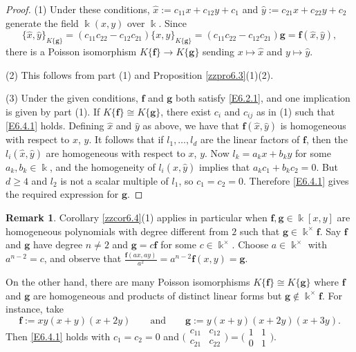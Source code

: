 \documentclass[12pt]{amsart}
\theoremstyle{plain}
\numberwithin{theorem}{section}
\numberwithin{equation}{theorem}
\theoremstyle{definition}
\newtheorem{remark}[theorem]{Remark}
\newcommand \bff {{\mathbf{f}}}
\newcommand \bfg {{\mathbf{g}}}
\newcommand \xhat {\hat{x}}
\newcommand \yhat {\hat{y}}
\newcommand \kx {\Bbbk^\times}
\begin{document}
\begin{proof}
(1) Under these conditions, $\xhat := c_{11}x+c_{12}y+c_1$ and $\yhat := c_{21}x+c_{22}y+c_2$ generate the field $\Bbbk(x,y)$ over $\Bbbk$.  Since
$$
\{ \xhat,\yhat \}_{K\{\bfg\}} = (c_{11}c_{22} - c_{12}c_{21}) \{x,y\}_{K\{\bfg\}} =  (c_{11}c_{22} - c_{12}c_{21}) \bfg = \bff(\xhat,\yhat),
$$
there is a Poisson isomorphism $K\{\bff\} \rightarrow K\{\bfg\}$ sending $x \mapsto \xhat$ and $y \mapsto \yhat$.

(2) This follows from part (1) and Proposition \ref{zzpro6.3}(1)(2).

(3) Under the given conditions, $\bff$ and $\bfg$ both satisfy \eqref{E6.2.1}, and one implication is given by part (1).  If $K\{\bff\} \cong K\{\bfg\}$, there exist $c_i$ and $c_{ij}$ as in (1) such that \eqref{E6.4.1} holds.  Defining $\xhat$ and $\yhat$ as above, we have that $\bff(\xhat,\yhat)$ is homogeneous with respect to $x$, $y$.  It follows that if $l_1,\dots,l_d$ are the linear factors of $\bff$, then the $l_i(\xhat,\yhat)$ are homogeneous with respect to $x$, $y$.  Now $l_k = a_kx+b_ky$ for some $a_k,b_k \in \Bbbk$, and the homogeneity of $l_i(\xhat,\yhat)$ implies that $a_kc_1+b_kc_2=0$.  But $d\ge4$ and $l_2$ is not a scalar multiple of $l_1$, so $c_1=c_2=0$.  Therefore \eqref{E6.4.1} gives the required expression for $\bfg$.
\end{proof}

\begin{remark}  \label{zzrem6.5} 
Corollary \ref{zzcor6.4}(1) applies in particular when $\bff,\bfg \in \Bbbk[x,y]$ are homogeneous polynomials with degree different from $2$ such that $\bfg \in \kx \bff$.  Say $\bff$ and $\bfg$ have degree $n \ne 2$ and $\bfg = c \bff$ for some $c \in \kx$.  Choose $a \in \kx$ with $a^{n-2} = c$, and observe that $\frac{\bff(ax,ay)}{a^2} = a^{n-2} \bff(x,y) = \bfg$.

On the other hand, there are many Poisson isomorphisms $K\{\bff\} \cong K\{\bfg\}$ where $\bff$ and $\bfg$ are homogeneous and products of distinct linear forms but $\bfg \notin \kx \bff$.  For instance, take
$$
\bff := x y (x+y) (x+2y) \qquad \text{and} \qquad \bfg := y (x+y) (x+2y) (x+3y).
$$
Then \eqref{E6.4.1} holds with $c_1=c_2=0$ and $\bigl( \begin{smallmatrix} c_{11}&c_{12}\\ c_{21}&c_{22} \end{smallmatrix} \bigr) = \bigl( \begin{smallmatrix} 1&1\\ 0&1 \end{smallmatrix} \bigr)$.
\end{remark}
\end{document}
